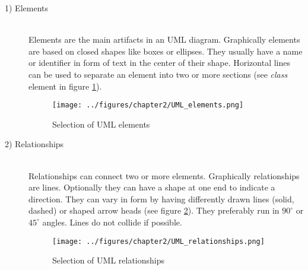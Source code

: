 \documentclass[twoside, openright, 12pt]{book}
\begin{document}
\begin{description}
\item[1) Elements]\hfill \\
Elements are the main artifacts in an UML diagram.
Graphically elements are based on closed shapes like boxes or ellipses.
They usually have a name or identifier in form of text in the center of their shape. Horizontal lines can be used to separate an element into two or more sections (see \textit{class} element in figure \ref{fig:UML_elements}). \\

\begin{figure}[htb]
	\centering
	\texttt{[image: ../figures/chapter2/UML\_elements.png]}
	\caption{Selection of UML elements}
	\label{fig:UML_elements}
\end{figure}

%

\item[2) Relationships]\hfill \\
Relationships can connect two or more elements.
Graphically relationships are lines.
Optionally they can have a shape at one end to indicate a direction.
They can vary in form by having differently drawn lines (solid, dashed) or shaped arrow heads (see figure \ref{fig:UML_relationships}).
They preferably run in $90^{\circ}$ or $45^{\circ}$ angles.
Lines do not collide if possible. \\

\begin{figure}[htb]
	\centering
	\texttt{[image: ../figures/chapter2/UML\_relationships.png]}
	\caption{Selection of UML relationships}
	\label{fig:UML_relationships}
\end{figure}
\end{description}
\end{document}
